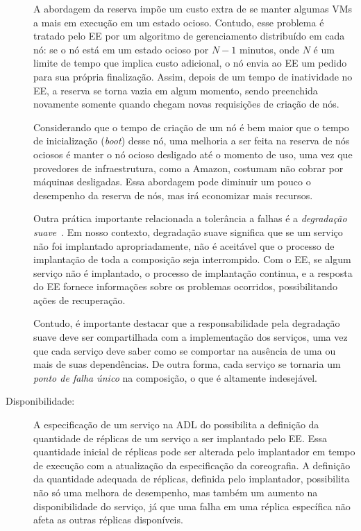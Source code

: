 \begin{description}
A abordagem da reserva impõe um custo extra de se manter algumas VMs a mais
em execução em um estado ocioso. Contudo, esse problema é tratado
pelo EE por um algoritmo de gerenciamento distribuído em cada nó:
se o nó está em um estado ocioso por $N-1$ minutos, onde $N$ é um limite
de tempo que implica custo adicional, o nó envia ao EE um pedido para 
sua própria finalização. Assim, depois de um tempo de inatividade no EE,
a reserva se torna vazia em algum momento, sendo preenchida novamente
somente quando chegam novas requisições de criação de nós.

Considerando que o tempo de criação de um nó é bem maior que o tempo de inicialização (\emph{boot})
desse nó, uma melhoria a ser feita na reserva de nós ociosos é manter o nó ocioso desligado
até o momento de uso, uma vez que provedores de infraestrutura, como a Amazon,
costumam não cobrar por máquinas desligadas.
Essa abordagem pode diminuir um pouco o desempenho da reserva de nós,
mas irá economizar mais recursos.

Outra prática importante relacionada a tolerância a falhas é a 
\emph{degradação suave}~\cite{Brewer2001GiantScale,Hamilton2007InternetScale}.
Em nosso contexto, degradação suave significa que se um serviço não foi 
implantado apropriadamente, não é aceitável que o processo de implantação
de toda a composição seja interrompido.
Com o EE, se algum serviço não é implantado, o processo de implantação continua,
e a resposta do EE fornece informações sobre os problemas ocorridos,
possibilitando ações de recuperação.

Contudo, é importante destacar que a responsabilidade pela degradação suave
deve ser compartilhada com a implementação dos serviços, uma vez que cada serviço
deve saber como se comportar na ausência de uma ou mais de suas dependências.
De outra forma, cada serviço se tornaria um \emph{ponto de falha único} na composição,
o que é altamente indesejável.

\item [Disponibilidade:]

A especificação de um serviço na ADL do \ee possibilita a definição da quantidade de réplicas
de um serviço a ser implantado pelo EE.
Essa quantidade inicial de réplicas pode ser alterada pelo implantador em tempo de execução
com a atualização da especificação da coreografia.
A definição da quantidade adequada de réplicas, definida pelo implantador, possibilita não só uma melhora
de desempenho, mas também um aumento na disponibilidade do serviço, já que uma falha em uma réplica
específica não afeta as outras réplicas disponíveis.


\end{description}
